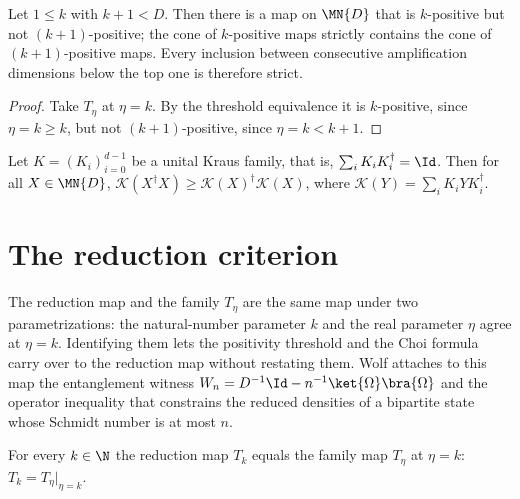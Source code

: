 \begin{corollary}
    \label{cor:positivity_chain_strict}
    \leanok
    Let $1\le k$ with $k+1<D$. Then there is a map on $\MN{D}$ that is
    $k$-positive but not $(k+1)$-positive; the cone of $k$-positive maps strictly
    contains the cone of $(k+1)$-positive maps. Every inclusion between
    consecutive amplification dimensions below the top one is therefore strict.
\end{corollary}

\begin{proof}
    \leanok
    Take $T_\eta$ at $\eta=k$. By the threshold equivalence it is $k$-positive,
    since $\eta=k\ge k$, but not $(k+1)$-positive, since $\eta=k<k+1$.
\end{proof}

\begin{theorem}
    \leanok
    Let $K=(K_i)_{i=0}^{d-1}$ be a unital Kraus family, that is,
    $\sum_i K_i K_i^\dagger=\Id$. Then for all $X\in\MN{D}$,
    $\mathcal{K}(X^\dagger X)\ge
        \mathcal{K}(X)^\dagger\mathcal{K}(X)$,
    where $\mathcal{K}(Y)=\sum_i K_i Y K_i^\dagger$.
\end{theorem}

\section{The reduction criterion}

The reduction map and the family $T_\eta$ are the same map under two
parametrizations: the natural-number parameter $k$ and the real parameter
$\eta$ agree at $\eta=k$. Identifying them lets the positivity threshold and
the Choi formula carry over to the reduction map without restating them. Wolf
attaches to this map the entanglement witness
$W_n=D^{-1}\Id-n^{-1}\ket{\Omega}\bra{\Omega}$ and the operator inequality
\cite[Equation~(3.18)]{Wolf2012Quantum} that constrains the reduced densities
of a bipartite state whose Schmidt number is at most $n$.

\begin{theorem}
    \label{thm:reduction_map_eq_t_eta}
    \leanok
    For every $k\in\N$ the reduction map $T_k$ equals the family map $T_\eta$ at
    $\eta=k$: $T_k=T_\eta\big|_{\eta=k}$.
\end{theorem}

